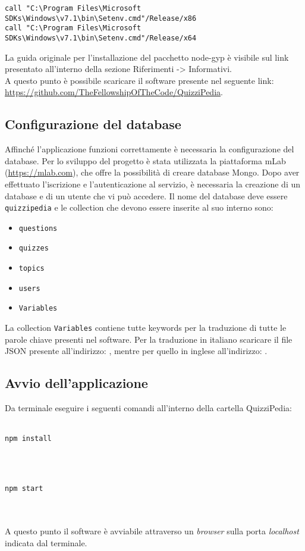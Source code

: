 	\begin{center}
		\verb|call "C:\Program Files\Microsoft SDKs\Windows\v7.1\bin\Setenv.cmd"/Release/x86|\\
		\verb|call "C:\Program Files\Microsoft SDKs\Windows\v7.1\bin\Setenv.cmd"/Release/x64|\\
	\end{center}
La guida originale per l'installazione del pacchetto node-gyp è visibile sul link presentato all'interno della sezione Riferimenti -> Informativi.\\
A questo punto è possibile scaricare il software presente nel seguente link: \url{https://github.com/TheFellowshipOfTheCode/QuizziPedia}.\\

\subsection{Configurazione del database}
Affinché l'applicazione funzioni correttamente è necessaria la configurazione del database. Per lo sviluppo del progetto è stata utilizzata la piattaforma mLab (\url{https://mlab.com}), che offre la possibilità di creare database Mongo. Dopo aver effettuato l'iscrizione e l'autenticazione al servizio, è necessaria la creazione di un database e di un utente che vi può accedere. Il nome del database deve essere \texttt{quizzipedia} e le collection che devono essere inserite al suo interno sono:
\begin{itemize}
	\item \texttt{questions}
	\item \texttt{quizzes}
	\item \texttt{topics}
	\item \texttt{users}
	\item \texttt{Variables}
\end{itemize}
 La collection \texttt{Variables} contiene tutte keywords per la traduzione di tutte le parole chiave presenti nel software. Per la traduzione in italiano scaricare il file JSON presente all'indirizzo: \url{}, mentre per quello in inglese all'indirizzo: \url{}.
\subsection{Avvio dell'applicazione}
Da terminale eseguire i seguenti comandi all'interno della cartella QuizziPedia:\\
\\
\centerline{\texttt{npm install}}\\
\\
\centerline{\texttt{npm start}}\\
\\
A questo punto il software è avviabile attraverso un \textit{browser} sulla porta \textit{localhost} indicata dal terminale.

